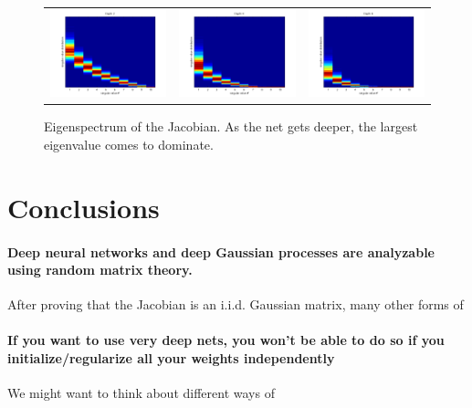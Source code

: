 \documentclass{article}
\begin{document}
\begin{figure}
\centering
\begin{tabular}{ccc}
\includegraphics[width=0.3\columnwidth]{figures/spectrum/svd_specturm_depth_2} &
\includegraphics[width=0.3\columnwidth]{figures/spectrum/svd_specturm_depth_4} &
\includegraphics[width=0.3\columnwidth]{figures/spectrum/svd_specturm_depth_6} \\
\end{tabular}
\caption{Eigenspectrum of the Jacobian.  As the net gets deeper, the largest eigenvalue comes to dominate.}
\label{fig:deep_spectrum}
\end{figure}
\section{Conclusions}

\paragraph{Deep neural networks and deep Gaussian processes are analyzable using random matrix theory.}  After proving that the Jacobian is an i.i.d. Gaussian matrix, many other forms of 

\paragraph{If you want to use very deep nets, you won't be able to do so if you initialize/regularize all your weights independently}  We might want to think about different ways of 
\end{document}
